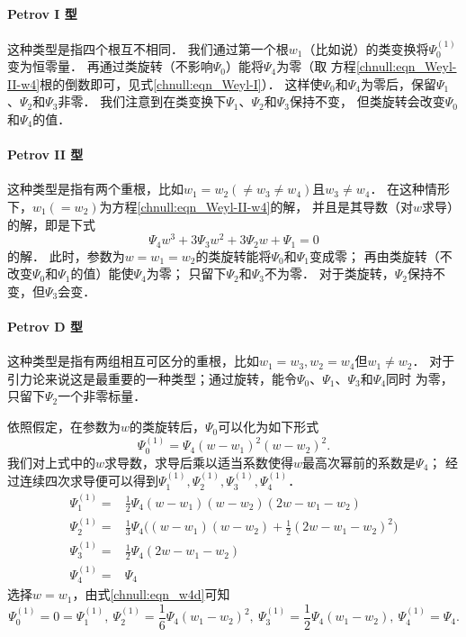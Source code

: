 \paragraph{Petrov I 型}
这种类型是指四个根互不相同．
我们通过第一个根$w_1$（比如说）的类变换将$\Psi_0^{(1)}$变为恒零量．
再通过类旋转（不影响$\Psi_0$）能将$\Psi_4$为零（取
方程\eqref{chnull:eqn_Weyl-II-w4}根的倒数即可，见式\eqref{chnull:eqn_Weyl-I}）．
这样使$\Psi_0$和$\Psi_4$为零后，保留$\Psi_1$、$\Psi_2$和$\Psi_3$非零．
我们注意到在类变换下$\Psi_1$、$\Psi_2$和$\Psi_3$保持不变，
但类旋转会改变$\Psi_0$和$\Psi_4$的值．


\paragraph{Petrov II 型}
这种类型是指有两个重根，比如$w_1=w_2(\neq w_3 \neq w_4)$且$w_3\neq w_4$．
在这种情形下，$w_1(=w_2)$为方程\eqref{chnull:eqn_Weyl-II-w4}的解，
并且是其导数（对$w$求导）的解，即是下式
\begin{equation}\label{chnull:eqn_Weyl-II-w4-d1}
    \Psi_{4} w^3 +  3 \Psi_{3}  w^2 + 3  \Psi_{2} w +  \Psi_{1} = 0
\end{equation}
的解．
此时，参数为$w=w_1=w_2$的类旋转能将$\Psi_0$和$\Psi_1$变成零；
再由类旋转（不改变$\Psi_0$和$\Psi_1$的值）能使$\Psi_4$为零；
只留下$\Psi_2$和$\Psi_3$不为零．
对于类旋转，$\Psi_2$保持不变，但$\Psi_3$会变．

\paragraph{Petrov D 型}
这种类型是指有两组相互可区分的重根，比如$w_1=w_3, w_2 = w_4$但$w_1\neq w_2$．
对于引力论来说这是最重要的一种类型；通过旋转，能令$\Psi_0$、$\Psi_1$、$\Psi_3$和$\Psi_4$同时
为零，只留下$\Psi_2$一个非零标量．


依照假定，在参数为$w$的类旋转后，$\Psi_0$可以化为如下形式
\begin{equation}
    \Psi_0^{(1)} = \Psi_4 (w-w_1)^2 (w-w_2)^2.
\end{equation}
我们对上式中的$w$求导数，求导后乘以适当系数使得$w$最高次幂前的系数是$\Psi_4$；
经过连续四次求导便可以得到$\Psi_1^{(1)},\Psi_2^{(1)},\Psi_3^{(1)},\Psi_4^{(1)}$．
\begin{subequations}\label{chnull:eqn_w4d}
    \begin{align}
        \Psi_1^{(1)} =& \frac{1}{2}\Psi_4 (w-w_1)(w-w_2)(2w-w_1-w_2)\\
        \Psi_2^{(1)} =& \frac{1}{3}\Psi_4 \bigl((w-w_1)(w-w_2)+\frac{1}{2}(2w-w_1-w_2)^2\bigr)\\
        \Psi_3^{(1)} =& \frac{1}{2}\Psi_4 (2w-w_1-w_2) \\
        \Psi_4^{(1)} =& \Psi_4
    \end{align}
\end{subequations}
选择$w=w_1$，由式\eqref{chnull:eqn_w4d}可知
\begin{equation*}
    \Psi_0^{(1)}=0=\Psi_1^{(1)},\
    \Psi_2^{(1)}=\frac{1}{6}\Psi_4 (w_1-w_2)^2, \
    \Psi_3^{(1)}=\frac{1}{2}\Psi_4 (w_1-w_2),\
    \Psi_4^{(1)} = \Psi_4 .
\end{equation*}

